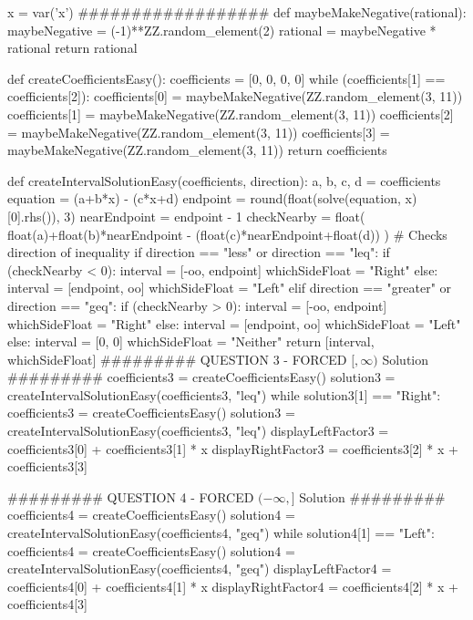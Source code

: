 \documentclass{ximera}
\begin{document}
\begin{sagesilent}
x = var('x')
##################
def maybeMakeNegative(rational):
    maybeNegative = (-1)**ZZ.random_element(2)
    rational = maybeNegative * rational
    return rational

def createCoefficientsEasy():
    coefficients = [0, 0, 0, 0]
    while (coefficients[1] == coefficients[2]):
        coefficients[0] = maybeMakeNegative(ZZ.random_element(3, 11))
        coefficients[1] = maybeMakeNegative(ZZ.random_element(3, 11))
        coefficients[2] = maybeMakeNegative(ZZ.random_element(3, 11))
        coefficients[3] = maybeMakeNegative(ZZ.random_element(3, 11))
    return coefficients

def createIntervalSolutionEasy(coefficients, direction):
    a, b, c, d = coefficients
    equation = (a+b*x) - (c*x+d)
    endpoint = round(float(solve(equation, x)[0].rhs()), 3)
    nearEndpoint = endpoint - 1
    checkNearby = float( float(a)+float(b)*nearEndpoint - (float(c)*nearEndpoint+float(d)) )
    # Checks direction of inequality
    if direction == "less" or direction == "leq":
        if (checkNearby < 0):
            interval = [-oo, endpoint]
            whichSideFloat = "Right"
        else:
            interval = [endpoint, oo]   
            whichSideFloat = "Left"
    elif direction == "greater" or direction == "geq": 
        if (checkNearby > 0):
            interval = [-oo, endpoint]
            whichSideFloat = "Right"
        else:
            interval = [endpoint, oo]
            whichSideFloat = "Left"
    else: 
        interval = [0, 0]
        whichSideFloat = "Neither"
    return [interval, whichSideFloat]
######### QUESTION 3 - FORCED $[, \infty)$ Solution #########
coefficients3 = createCoefficientsEasy()
solution3 = createIntervalSolutionEasy(coefficients3, "leq")
while solution3[1] == "Right":
    coefficients3 = createCoefficientsEasy()
    solution3 = createIntervalSolutionEasy(coefficients3, "leq")
displayLeftFactor3 = coefficients3[0] + coefficients3[1] * x
displayRightFactor3 = coefficients3[2] * x + coefficients3[3]

######### QUESTION 4 - FORCED $(-\infty, ]$ Solution #########
coefficients4 = createCoefficientsEasy()
solution4 = createIntervalSolutionEasy(coefficients4, "geq")
while solution4[1] == "Left":
    coefficients4 = createCoefficientsEasy()
    solution4 = createIntervalSolutionEasy(coefficients4, "geq")
displayLeftFactor4 = coefficients4[0] + coefficients4[1] * x
displayRightFactor4 = coefficients4[2] * x + coefficients4[3]


\end{sagesilent}
\end{document}
